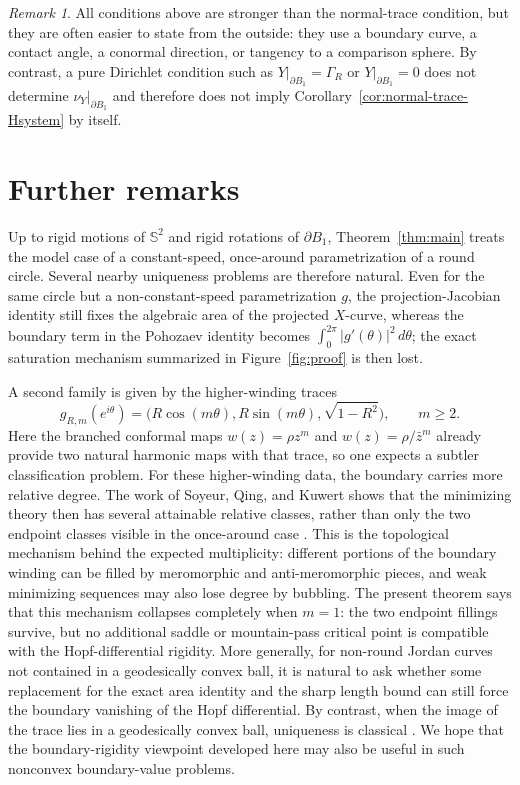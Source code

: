 \documentclass[11pt]{amsart}
\numberwithin{equation}{section}
\theoremstyle{remark}
\newtheorem*{remark}{Remark}
\newcommand{\B}{B_1}
\newcommand{\Sph}{\mathbb{S}^2}
\begin{document}
\begin{remark}
All conditions above are stronger than the normal-trace condition, but they are often easier to state from the outside: they use a boundary
curve, a contact angle, a conormal direction, or tangency to a comparison sphere. By contrast, a pure Dirichlet condition such as
$Y|_{\partial\B}=\Gamma_R$ or $Y|_{\partial\B}=0$ does not determine $\nu_Y|_{\partial\B}$ and therefore does not imply
Corollary~\ref{cor:normal-trace-Hsystem} by itself.
\end{remark}

\section{Further remarks}\label{sec:further-remarks}

Up to rigid motions of $\Sph$ and rigid rotations of $\partial B_1$, Theorem~\ref{thm:main} treats the model case of a constant-speed,
once-around parametrization of a round circle. Several nearby uniqueness problems are therefore natural. Even for the same circle but a
non-constant-speed parametrization $g$, the projection-Jacobian identity still fixes the algebraic area of the projected $X$-curve, whereas
the boundary term in the Pohozaev identity becomes $\int_0^{2\pi}|g'(\theta)|^2\,d\theta$; the exact saturation mechanism summarized in
Figure~\ref{fig:proof} is then lost.

A second family is given by the higher-winding traces
\[
 g_{R,m}(e^{i\theta})=
 \bigl(R\cos(m\theta),R\sin(m\theta),\sqrt{1-R^2}\bigr),
 \qquad m\ge 2.
\]
Here the branched conformal maps $w(z)=\rho z^m$ and $w(z)=\rho/\bar z^m$ already provide two natural harmonic maps with that trace, so one
expects a subtler classification problem. For these higher-winding data, the boundary carries more relative degree. The work of Soyeur, Qing,
and Kuwert shows that the minimizing theory then has several attainable relative classes, rather than only the two endpoint classes visible in
the once-around case \cite{Soyeur1989,Qing1992Remark,Qing1992Multiple,Kuwert1994}. This is the topological mechanism behind the expected
multiplicity: different portions of the boundary winding can be filled by meromorphic and anti-meromorphic pieces, and weak minimizing
sequences may also lose degree by bubbling. The present theorem says that this mechanism collapses completely when \(m=1\): the two endpoint
fillings survive, but no additional saddle or mountain-pass critical point is compatible with the Hopf-differential rigidity. More generally,
for non-round Jordan curves not contained in a geodesically convex ball, it is natural to ask whether some replacement for the exact area
identity and the sharp length bound can still force the boundary vanishing of the Hopf differential. By contrast, when the image of the trace
lies in a geodesically convex ball, uniqueness is classical \cite{HKW1977,JaegerKaul1979}. We hope that the boundary-rigidity viewpoint
developed here may also be useful in such nonconvex boundary-value problems.
\end{document}
